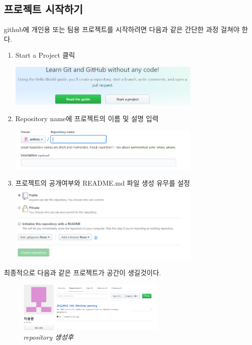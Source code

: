 \documentclass[12pt]{article}
\begin{document}
	\subsection{프로젝트 시작하기}
  	github에 개인용 또는 팀용 프로젝트를 시작하려면 다음과 같은 간단한 과정 걸쳐야 한다.
  	\begin{mdframed}[
  		linecolor= black,
  		roundcorner=10pt,
  		innertopmargin =\topskip,
  		leftmargin = 0.5cm,
  		rightmargin = 0.5cm,
  		frametitleaboveskip = 0.5pt,
  		frametitlerulewidth = 0.5pt,
  		frametitlealignment =,
  		frametitlebackgroundcolor = yellow,			
  		frametitle = {githhub 가입하기}	]
  		\begin{enumerate}
  			\item Start a Project 클릭
  			
  			\includegraphics[width=0.75\textwidth]{start}
  			\item Repository name에 프로젝트의 이름 및 설명 입력
  			
  			 \includegraphics[width=0.75\textwidth]{owner}
  			\item 프로젝트의 공개여부와 README.md 파일 생성 유무를 설정  			
  			\includegraphics[width=0.75\textwidth]{publc}
  		\end{enumerate}  		
  	\end{mdframed} 
  최종적으로 다음과 같은 프로젝트가 공간이 생길것이다.  
  \begin{figure}[!hbp] 
  	\label{create_repository}
  	\includegraphics[width=0.65\textwidth]{create_repository}
  	\caption{\textsl{repository 생성후}}
  \end{figure}
\end{document}
